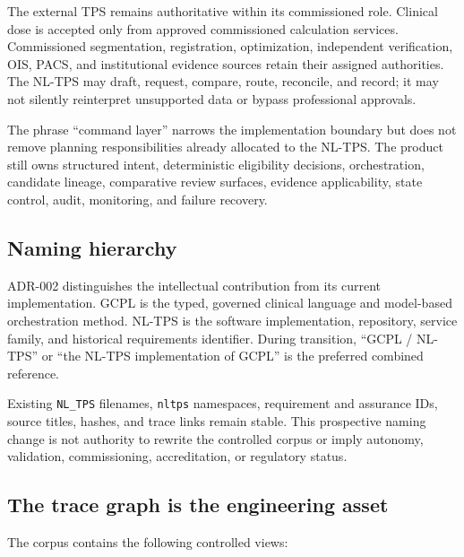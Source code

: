 \documentclass[11pt,letterpaper]{article}
\begin{document}
The external TPS remains authoritative within its commissioned role. Clinical dose is accepted only from approved commissioned calculation services. Commissioned segmentation, registration, optimization, independent verification, OIS, PACS, and institutional evidence sources retain their assigned authorities. The NL-TPS may draft, request, compare, route, reconcile, and record; it may not silently reinterpret unsupported data or bypass professional approvals.

The phrase ``command layer'' narrows the implementation boundary but does not remove planning responsibilities already allocated to the NL-TPS. The product still owns structured intent, deterministic eligibility decisions, orchestration, candidate lineage, comparative review surfaces, evidence applicability, state control, audit, monitoring, and failure recovery.

\subsection{Naming hierarchy}

ADR-002 distinguishes the intellectual contribution from its current implementation. GCPL is the typed, governed clinical language and model-based orchestration method. NL-TPS is the software implementation, repository, service family, and historical requirements identifier. During transition, ``GCPL / NL-TPS'' or ``the NL-TPS implementation of GCPL'' is the preferred combined reference.

Existing \texttt{NL\_TPS} filenames, \texttt{nltps} namespaces, requirement and assurance IDs, source titles, hashes, and trace links remain stable. This prospective naming change is not authority to rewrite the controlled corpus or imply autonomy, validation, commissioning, accreditation, or regulatory status.

\subsection{The trace graph is the engineering asset}

The corpus contains the following controlled views:
\end{document}
